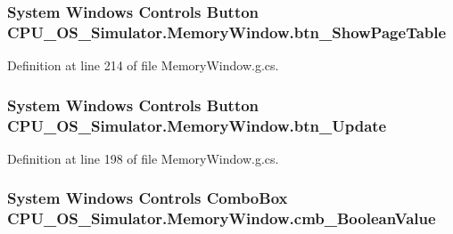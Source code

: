 \subsubsection[{btn\+\_\+\+Show\+Page\+Table}]{\setlength{\rightskip}{0pt plus 5cm}System Windows Controls Button C\+P\+U\+\_\+\+O\+S\+\_\+\+Simulator.\+Memory\+Window.\+btn\+\_\+\+Show\+Page\+Table\hspace{0.3cm}{\ttfamily [package]}}\label{class_c_p_u___o_s___simulator_1_1_memory_window_a62372edf818561f1584160d41c2f67f7}


Definition at line 214 of file Memory\+Window.\+g.\+cs.

\hypertarget{class_c_p_u___o_s___simulator_1_1_memory_window_a9274df08bf008c43b325e50d6db6067f}{}
\subsubsection[{btn\+\_\+\+Update}]{\setlength{\rightskip}{0pt plus 5cm}System Windows Controls Button C\+P\+U\+\_\+\+O\+S\+\_\+\+Simulator.\+Memory\+Window.\+btn\+\_\+\+Update\hspace{0.3cm}{\ttfamily [package]}}\label{class_c_p_u___o_s___simulator_1_1_memory_window_a9274df08bf008c43b325e50d6db6067f}


Definition at line 198 of file Memory\+Window.\+g.\+cs.

\hypertarget{class_c_p_u___o_s___simulator_1_1_memory_window_a2a1da5df6a425ce20c7b639fa66c58f2}{}
\subsubsection[{cmb\+\_\+\+Boolean\+Value}]{\setlength{\rightskip}{0pt plus 5cm}System Windows Controls Combo\+Box C\+P\+U\+\_\+\+O\+S\+\_\+\+Simulator.\+Memory\+Window.\+cmb\+\_\+\+Boolean\+Value\hspace{0.3cm}{\ttfamily [package]}}\label{class_c_p_u___o_s___simulator_1_1_memory_window_a2a1da5df6a425ce20c7b639fa66c58f2}



